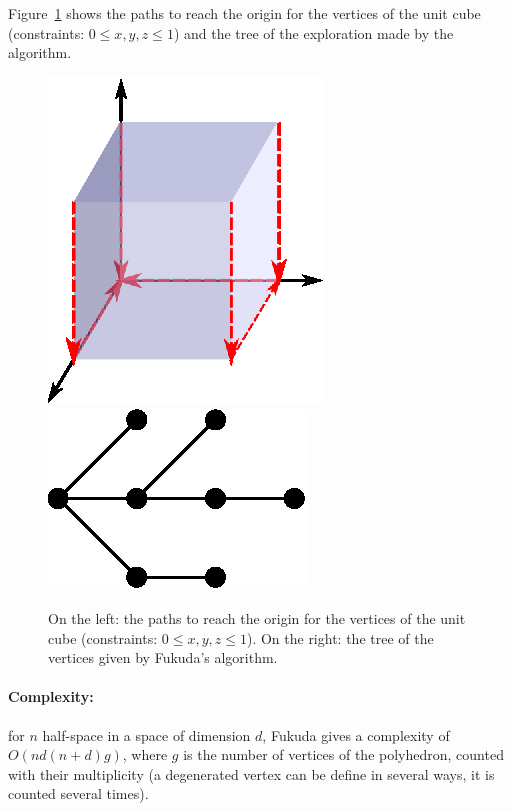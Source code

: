 Figure~\ref{ex_fuku} shows the paths to reach the origin for the vertices of the unit cube (constraints: $0\leq x,y,z \leq 1$) and the tree of the exploration made by the algorithm.

\begin{figure}
\includegraphics[scale=1.1]{images/fukuda.eps}
\hspace*{0.5cm}
\includegraphics[scale=1]{images/fukugraph.eps}
\caption{On the left:  the paths to reach the origin for the vertices of the unit cube (constraints: $0\leq x,y,z \leq 1$). On the right: the tree of the vertices given by Fukuda's algorithm.}
\label{ex_fuku}
\end{figure}

\paragraph{Complexity:} for $n$ half-space in a space of dimension $d$, Fukuda gives a complexity of $O(nd(n+d)g)$, where $g$ is the number of vertices of the polyhedron, counted with their multiplicity (a degenerated vertex can be define in several ways, it is counted several times). 
